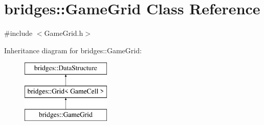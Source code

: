 \hypertarget{classbridges_1_1_game_grid}{}\section{bridges\+:\+:Game\+Grid Class Reference}
\label{classbridges_1_1_game_grid}


{\ttfamily \#include $<$Game\+Grid.\+h$>$}

Inheritance diagram for bridges\+:\+:Game\+Grid\+:\begin{figure}[H]
\begin{center}
\leavevmode
\includegraphics[height=3.000000cm]{classbridges_1_1_game_grid}
\end{center}
\end{figure}
